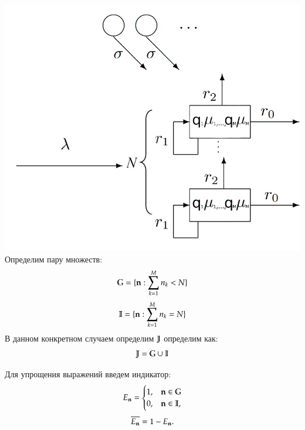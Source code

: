 \includegraphics[scale=0.4]{NExecutionMPhase}
\\
Определим пару множеств:
\[\mathbb{G} = \{\bold{n} : \sum_{k=1}^{M}n_k < N\}\]
\[\mathbb{I} = \{\bold{n} : \sum_{k=1}^{M}n_k = N\}\]
В данном конкретном случаем определим \(\mathbb{J}\) определим как:
\[\mathbb{J} = \mathbb{G} \cup \mathbb{I}\]

Для упрощения выражений введем индикатор:
\begin{equation*}
    E_{\bold{n}} =
    \begin{cases}
        1, &{\bold{n} \in \mathbb{G} }\\
        0, &{\bold{n} \in \mathbb{I} },
    \end{cases}
\end{equation*}
\begin{equation*}
    \overline{E_{\bold{n}}} = 1 - E_{\bold{n}}.
\end{equation*}


